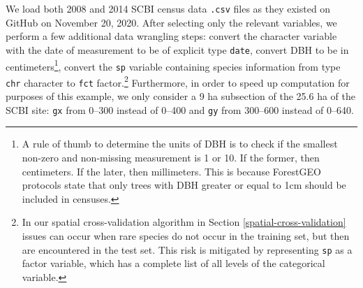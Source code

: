 \documentclass[12pt]{article}
\newenvironment{Shaded}{\begin{snugshade}}{\end{snugshade}}
\newcommand{\DataTypeTok}[1]{\textcolor[rgb]{0.13,0.29,0.53}{#1}}
\newcommand{\DecValTok}[1]{\textcolor[rgb]{0.00,0.00,0.81}{#1}}
\newcommand{\KeywordTok}[1]{\textcolor[rgb]{0.13,0.29,0.53}{\textbf{#1}}}
\newcommand{\NormalTok}[1]{#1}
\newcommand{\OperatorTok}[1]{\textcolor[rgb]{0.81,0.36,0.00}{\textbf{#1}}}
\newcommand{\StringTok}[1]{\textcolor[rgb]{0.31,0.60,0.02}{#1}}
\begin{document}
We load both 2008 and 2014 SCBI census data \texttt{.csv} files as they
existed on GitHub on November 20, 2020. After selecting only the
relevant variables, we perform a few additional data wrangling steps:
convert the character variable with the date of measurement to be of
explicit type \texttt{date}, convert DBH to be in centimeters\footnote{A
  rule of thumb to determine the units of DBH is to check if the
  smallest non-zero and non-missing measurement is 1 or 10. If the
  former, then centimeters. If the later, then millimeters. This is
  because ForestGEO protocols state that only trees with DBH greater or
  equal to 1cm should be included in censuses.}, convert the \texttt{sp}
variable containing species information from type \texttt{chr} character
to \texttt{fct} factor.\footnote{In our spatial cross-validation
  algorithm in Section \ref{spatial-cross-validation} issues can occur
  when rare species do not occur in the training set, but then are
  encountered in the test set. This risk is mitigated by representing
  \texttt{sp} as a factor variable, which has a complete list of all
  levels of the categorical variable.} Furthermore, in order to speed up
computation for purposes of this example, we only consider a 9 ha
subsection of the 25.6 ha of the SCBI site: \texttt{gx} from 0--300
instead of 0--400 and \texttt{gy} from 300--600 instead of 0--640.

\begin{Shaded}
\end{Shaded}
\end{document}
